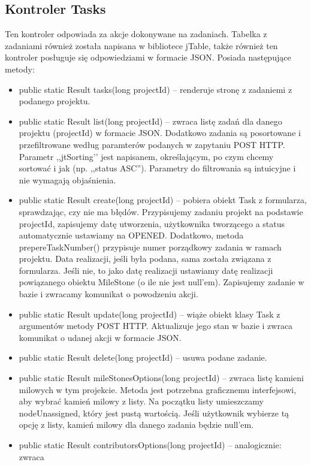 \documentclass[a4paper,12pt,notitlepage]{mwrep}
\begin{document}
\subsection{Kontroler Tasks}
Ten kontroler odpowiada za akcje dokonywane na zadaniach. Tabelka z zadaniami również
została napisana w bibliotece jTable, także również ten kontroler posługuje się odpowiedziami
w formacie JSON. Posiada następujące metody:
\begin{itemize}
    \item    public static Result tasks(long projectId) -- renderuje stronę z zadaniemi z
        podanego projektu.
    \item    public static Result list(long projectId) -- zwraca listę zadań dla
        danego projektu (projectId) w formacie JSON. Dodatkowo zadania są
        posortowane i przefiltrowane według paramterów podanych w zapytaniu
        POST HTTP. Parametr ,,jtSorting’’ jest napisanem, określającym, po czym
        chcemy sortować i jak (np. ,,status ASC”). Parametry do filtrowania są
        intuicyjne i nie wymagają objaśnienia.
    \item    public static Result create(long projectId) -- pobiera obiekt Task z
formularza, sprawdzając, czy nie ma błędów. Przypisujemy zadaniu
projekt na podstawie projectId, zapisujemy datę utworzenia, użytkownika
tworzącego a status automatycznie ustawiamy na OPENED. Dodatkowo,
metoda prepereTaskNumber() przypisuje numer porządkowy zadania
w ramach projektu. Data  realizacji, jeśli była podana, sama została związana
z formularza. Jeśli nie, to jako datę realizacji ustawiamy datę realizacji
powiązanego obiektu MileStone (o ile nie jest null’em). Zapisujemy
zadanie w bazie i zwracamy komunikat o powodzeniu akcji.
\item    public static Result update(long projectId) -- wiąże obiekt klasy Task z
    argumentów metody POST HTTP. Aktualizuje jego stan w bazie i zwraca
    komunikat o udanej akcji w formacie JSON.
\item    public static Result delete(long projectId) -- usuwa podane zadanie.
\item    public static Result mileStonesOptions(long projectId) -- zwraca listę
    kamieni milowych w tym projekcie. Metoda jest potrzebna graficznemu
    interfejsowi, aby wybrać kamień milowy z listy. Na początku listy
    umieszczamy nodeUnassigned, który jest pustą wartością. Jeśli użytkownik
    wybierze tą opcję z listy, kamień milowy dla danego zadania będzie null’em.
\item    public static Result contributorsOptions(long projectId) -- analogicznie: zwraca

\end{itemize}
\end{document}
